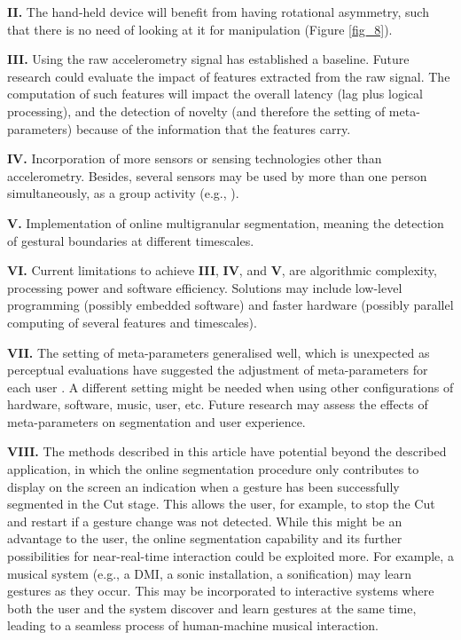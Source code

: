 \documentclass{nime-alternate_ADJ} %
\begin{document}
\textbf{II.} The hand-held device will benefit from having rotational asymmetry, such that there is no need of looking at it for manipulation (Figure \ref{fig_8}).

\textbf{III.}  Using the raw accelerometry signal has established a baseline. Future research could evaluate the impact of features extracted from the raw signal. The computation of such features will impact the overall latency (lag plus logical processing), and the detection of novelty (and therefore the setting of meta-parameters) because of the information that the features carry. 

\textbf{IV.}  Incorporation of more sensors or sensing technologies other than accelerometry. Besides, several sensors may be used by more than one person simultaneously, as a group activity (e.g., \cite{Staudt_etal_2022, Tahiroglu_etal_2013}). 

\textbf{V.} Implementation of online multigranular segmentation, meaning the detection of gestural boundaries at different timescales.

\textbf{VI.} Current limitations to achieve \textbf{III}, \textbf{IV}, and \textbf{V}, are algorithmic complexity, processing power and software efficiency. Solutions may include low-level programming (possibly embedded software) and faster hardware (possibly parallel computing of several features and timescales).

\textbf{VII.} The setting of meta-parameters generalised well, which is unexpected as perceptual evaluations have suggested the adjustment of meta-parameters for each user 
\cite{Mendoza_2022}. 
A different setting might be needed when using other configurations of hardware, software, music, user, etc. Future research may assess the effects of meta-parameters on segmentation and user experience.

\textbf{VIII.} The methods described in this article have potential beyond the described application, in which the online segmentation procedure only contributes to display on the screen an indication when a gesture has been successfully segmented in the Cut stage. This allows the user, for example, to stop the Cut and restart if a gesture change was not detected. While this might be an advantage to the user, the online segmentation capability and its further possibilities for near-real-time interaction could be exploited more. For example, a musical system (e.g., a DMI, a sonic installation, a sonification) may learn gestures as they occur. This may be incorporated to interactive systems where both the user and the system discover and learn gestures at the same time, leading to a seamless process of human-machine musical interaction.
\end{document}
